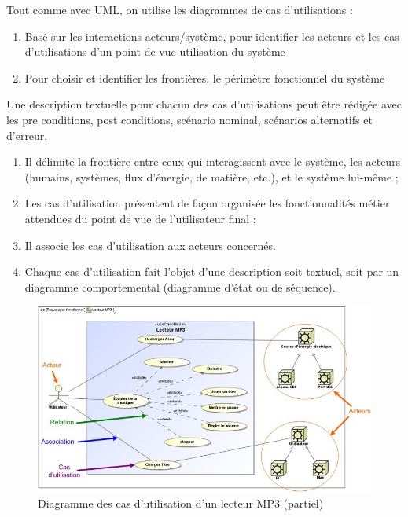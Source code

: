 \documentclass[12pt,a4paper]{report}
\begin{document}
\begin{flushleft}
	
	
	\noindent Tout comme avec UML, on utilise les diagrammes de cas d'utilisations :
	
	\noindent 
\end{flushleft}

\begin{enumerate}
	\item  Bas\'{e} sur les interactions acteurs/syst\`{e}me, pour identifier les acteurs et les cas d'utilisations d'un point de vue utilisation du syst\`{e}me
	
	\item  Pour choisir et identifier les fronti\`{e}res, le p\'{e}rim\`{e}tre fonctionnel du syst\`{e}me
\end{enumerate}

\noindent \begin{flushleft}
	Une description textuelle pour chacun des cas d'utilisations peut \^{e}tre r\'{e}dig\'{e}e avec les pre conditions, post conditions, sc\'{e}nario nominal, sc\'{e}narios alternatifs et d'erreur.
\end{flushleft}

\begin{enumerate}
	\item  Il d\'{e}limite la fronti\`{e}re entre ceux qui interagissent avec le syst\`{e}me, les acteurs (humains, syst\`{e}mes, flux d'\'{e}nergie, de mati\`{e}re, etc.), et le syst\`{e}me lui-m\^{e}me ;
	
	\item  Les cas d'utilisation pr\'{e}sentent de fa\c{c}on organis\'{e}e les fonctionnalit\'{e}s m\'{e}tier attendues du point de vue de l'utilisateur final ;
	
	\item  Il associe les cas d'utilisation aux acteurs concern\'{e}s.
	
	\item  Chaque cas d'utilisation fait l'objet d'une description soit textuel, soit par un diagramme comportemental (diagramme d'\'{e}tat ou de s\'{e}quence).
\end{enumerate}


\begin{figure}[H]
	\centering
	\includegraphics[width=0.8\linewidth]{image1.png}
	\caption{Diagramme des cas d'utilisation d'un lecteur MP3 (partiel)}

\end{figure}
\end{document}
